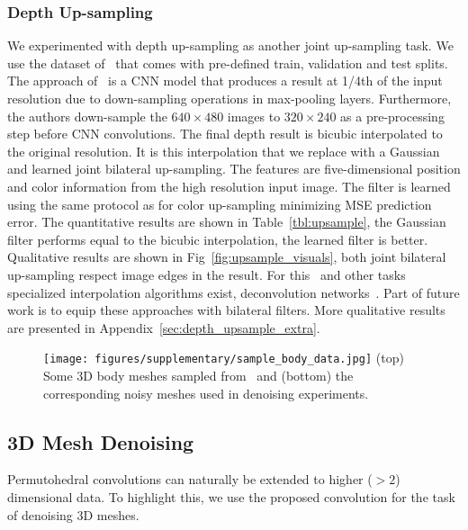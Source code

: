 \subsubsection{Depth Up-sampling}
We experimented with depth up-sampling as another joint up-sampling task. We use the dataset
of~\cite{silberman2012indoor} that comes with pre-defined
train, validation and test splits. The approach of~\cite{eigen2014depth} is a CNN
model that produces a result at 1/4th of the input resolution due to down-sampling operations in
max-pooling layers. Furthermore, the authors down-sample the $640\times 480$ images to $320\times 240$
as a pre-processing step before CNN convolutions. The final depth result is bicubic interpolated to the
original resolution. It is this interpolation that we replace with a Gaussian and learned joint
bilateral up-sampling. The features are five-dimensional position
and color information from the high resolution input image. The filter is learned using the same protocol
as for color up-sampling minimizing MSE prediction error. The quantitative results
are shown in Table~\ref{tbl:upsample}, the Gaussian filter performs equal to the bicubic interpolation,
the learned filter is better. Qualitative results are shown in Fig~\ref{fig:upsample_visuals},
both joint bilateral up-sampling respect image edges in the result. For this~\cite{ferstl2015b} and other tasks
specialized interpolation algorithms exist, \eg deconvolution networks~\cite{zeiler2010deconvolutional}. Part of future work is to equip these approaches with bilateral filters. More qualitative results are
presented in Appendix~\ref{sec:depth_upsample_extra}.

\begin{figure}[h!]
  \centering
    \texttt{[image: figures/supplementary/sample\_body\_data.jpg]}
  {(top) Some 3D body meshes sampled from~\cite{SMPL:2015} and (bottom) the corresponding noisy meshes used in denoising experiments.}
\label{fig:samplebody}
\end{figure}

\subsection{3D Mesh Denoising}\label{sec:mesh_denoising}

Permutohedral convolutions can naturally be extended to higher ($>2$)
dimensional data. To highlight this, we use the proposed convolution for the task
of denoising 3D meshes.


